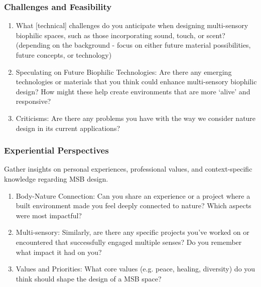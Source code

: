\subsubsection{Challenges and Feasibility}
\begin{enumerate}
    \item What [technical] challenges do you anticipate when designing multi-sensory biophilic spaces, such as those incorporating sound, touch, or scent? (depending on the background - focus on either future material possibilities, future concepts, or technology)
    \item Speculating on Future Biophilic Technologies: Are there any emerging technologies or materials that you think could enhance multi-sensory biophilic design? How might these help create environments that are more ‘alive’ and responsive?
    \item Criticisms: Are there any problems you have with the way we consider nature design in its current applications?
\end{enumerate}


\subsubsection{Experiential Perspectives} 
Gather insights on personal experiences, professional values, and context-specific knowledge regarding MSB design.
\begin{enumerate}
    \item Body-Nature Connection: Can you share an experience or a project where a built environment made you feel deeply connected to nature? Which aspects were most impactful?
    \item Multi-sensory: Similarly, are there any specific projects you've worked on or encountered that successfully engaged multiple senses? Do you remember what impact it had on you? 
    \item Values and Priorities: What core values (e.g. peace, healing, diversity) do you think should shape the design of a MSB space?
\end{enumerate}



